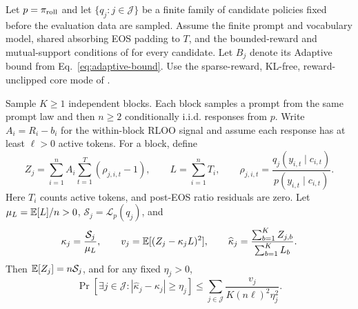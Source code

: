 \begin{theorem}
\label{thm:promax-certificate}
Let $p=\pi_{\mathrm{roll}}$ and let $\{q_j:j\in\mathcal J\}$ be a finite family of
candidate policies fixed before the evaluation data are sampled. Assume the
finite prompt and vocabulary model, shared absorbing EOS padding to $T$,
and the bounded-reward and mutual-support conditions of
 for every candidate. Let $B_j$ denote its Adaptive
bound from Eq.~\eqref{eq:adaptive-bound}. Use the sparse-reward,
KL-free, reward-unclipped core mode of .

Sample $K\ge1$ independent blocks. Each block samples a prompt from the
same prompt law and then $n\ge2$ conditionally i.i.d. responses from $p$.
Write $A_i=R_i-b_i$ for the within-block RLOO signal and assume each
response has at least $\ell>0$ active tokens. For a block, define
\begin{equation*}
    Z_j=\sum_{i=1}^{n} A_i\sum_{t=1}^{T}(\rho_{j,i,t}-1),
    \qquad L=\sum_{i=1}^{n}T_i,
    \qquad \rho_{j,i,t}=\frac{q_j(y_{i,t}\mid c_{i,t})}{p(y_{i,t}\mid c_{i,t})}.
\end{equation*}
Here $T_i$ counts active tokens, and post-EOS ratio residuals are zero.
Let $\mu_L=\mathbb{E}[L]/n>0$, $\mathcal S_j=\mathcal L_p(q_j)$, and
\begin{equation*}
    \kappa_j=\frac{\mathcal S_j}{\mu_L},\qquad
    v_j=\mathbb{E}[(Z_j-\kappa_j L)^2],\qquad
    \widehat\kappa_j=\frac{\sum_{b=1}^{K}Z_{j,b}}{\sum_{b=1}^{K}L_b}.
\end{equation*}
Then $\mathbb{E}[Z_j]=n\mathcal S_j$, and for any fixed $\eta_j>0$,
\begin{equation}
    \Pr\!\left[\exists j\in\mathcal J:
       |\widehat\kappa_j-\kappa_j|\ge\eta_j\right]
    \le \sum_{j\in\mathcal J}\frac{v_j}{K(n\ell)^2\eta_j^2}.
    \label{eq:promax-uniform-confidence}
\end{equation}


\end{theorem}
